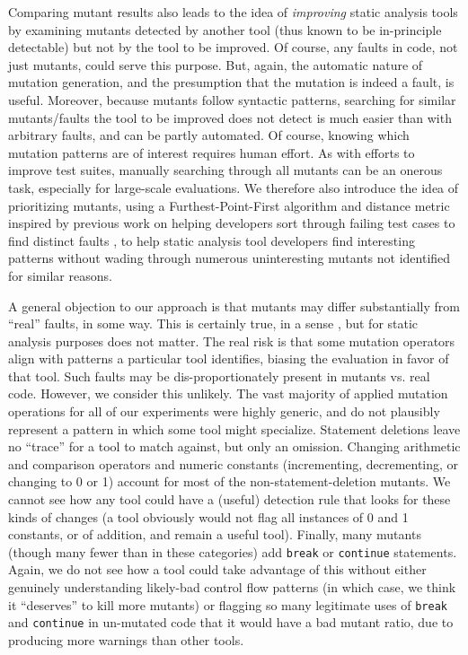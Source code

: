 Comparing mutant results also leads to the idea of \emph{improving} static analysis tools by examining mutants detected by another tool (thus known to be in-principle detectable) but not by the tool to be improved.  Of course, any faults in code, not just mutants, could serve this purpose.  But, again, the automatic nature of mutation generation, and the presumption that the mutation is indeed a fault, is useful.  Moreover, because mutants follow syntactic patterns, searching for similar mutants/faults the tool to be improved does not detect is much easier than with arbitrary faults, and can be partly automated.  Of course, knowing which mutation patterns are of interest requires human effort.  As with efforts to improve test suites, manually searching through all mutants can be an onerous task, especially for large-scale evaluations.  We therefore also introduce the idea of prioritizing mutants, using a Furthest-Point-First \cite{Gonzalez} algorithm and distance metric inspired by previous work on helping developers sort through failing test cases to find distinct faults \cite{PLDI13,distMut}, to help static analysis tool developers find interesting patterns without wading through numerous uninteresting mutants not identified for similar reasons.

A general objection to our approach is that mutants may differ substantially from ``real'' faults, in some way.  This is certainly true, in a sense \cite{GopinathMutants}, but for static analysis purposes does not matter.   The real risk is that some mutation operators align with patterns a particular tool identifies, biasing the evaluation in favor of that tool.  Such faults may be dis-proportionately present in mutants vs. real code.  However, we consider this unlikely.  The vast majority of applied mutation operations for all of our experiments were highly generic, and do not plausibly represent a pattern in which some tool might specialize.  Statement deletions leave no ``trace'' for a tool to match against, but only an omission.  Changing arithmetic and comparison operators and numeric constants (incrementing, decrementing, or changing to 0 or 1) account for most of the non-statement-deletion mutants.  We cannot see how any tool could have a (useful) detection rule that looks for these kinds of changes (a tool obviously would not flag all instances of 0 and 1 constants, or of addition, and remain a useful tool).  Finally, many mutants (though many fewer than in these categories) add {\tt break} or {\tt continue} statements.  Again, we do not see how a tool could take advantage of this without either genuinely understanding likely-bad control flow patterns (in which case, we think it ``deserves'' to kill more mutants) or flagging so many legitimate uses of {\tt break} and {\tt continue} in un-mutated code that it would have a bad mutant ratio, due to producing more warnings than other tools. 

